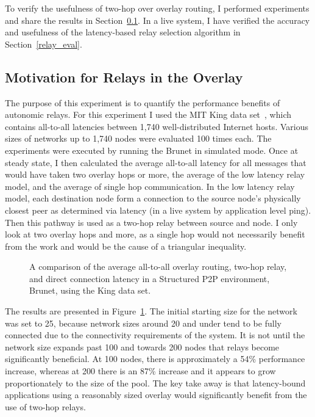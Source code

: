 To verify the usefulness of two-hop over overlay routing, I performed
experiments and share the results in Section~\ref{relay_motivation}.  In a live
system, I have verified the accuracy and usefulness of the latency-based relay
selection algorithm in Section~\ref{relay_eval}.

\subsection{Motivation for Relays in the Overlay}
\label{relay_motivation}

The purpose of this experiment is to quantify the performance benefits of
autonomic relays.  For this experiment I used the MIT King data
set~\cite{king_data}, which contains all-to-all latencies between 1,740
well-distributed Internet hosts.  Various sizes of networks up to 1,740 nodes
were evaluated 100 times each.  The experiments were executed by running the
Brunet in simulated mode.  Once at steady state, I then calculated the average
all-to-all latency for all messages that would have taken two overlay hops or
more, the average of the low latency relay model, and the average of single hop
communication.  In the low latency relay model, each destination node form a
connection to the source node's physically closest peer as determined via
latency (in a live system by application level ping).  Then this pathway is
used as a two-hop relay between source and node.  I only look at two overlay
hops and more, as a single hop would not necessarily benefit from the work and
would be the cause of a triangular inequality.  

\begin{figure}
\centering
{}
\caption[Motivation for relays]{A comparison of the average all-to-all overlay
routing, two-hop relay, and direct connection latency in a Structured P2P
environment, Brunet, using the King data set.}
\label{fig:simulated_relays}
\end{figure}

The results are presented in Figure~\ref{fig:simulated_relays}.  The initial
starting size for the network was set to 25, because network sizes around 20
and under tend to be fully connected due to the connectivity requirements of
the system.  It is not until the network size expands past 100 and towards 200
nodes that relays become significantly beneficial.  At 100 nodes, there is
approximately a 54\% performance increase, whereas at 200 there is an 87\%
increase and it appears to grow proportionately to the size of the pool.  The
key take away is that latency-bound applications using a reasonably sized
overlay would significantly benefit from the use of two-hop relays.

